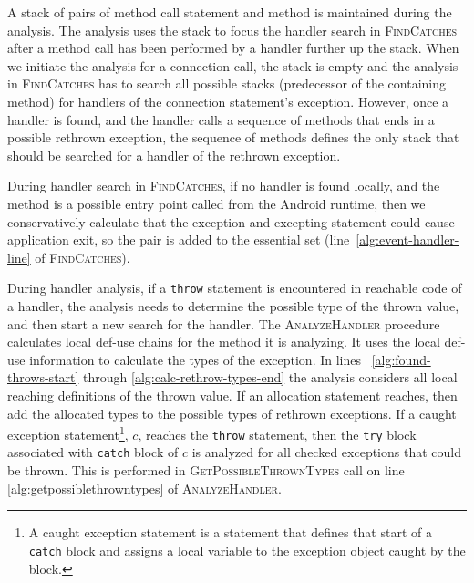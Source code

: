 A stack of pairs of method call statement and method is maintained
during the analysis.  The analysis uses the stack to focus the handler
search in \textsc{FindCatches} after a method call has been performed
by a handler further up the stack. When we initiate the analysis for
a connection call, the stack is empty and the analysis in
\textsc{FindCatches} has to search all possible stacks (predecessor of
the containing method) for handlers of the connection statement's
exception.  However, once a handler is found, and the handler calls a
sequence of methods that ends in a possible rethrown exception, the
sequence of methods defines the only stack that should be searched for
a handler of the rethrown exception.  


During handler search in \textsc{FindCatches}, if no handler is found
locally, and the method is a possible entry point called from the
Android runtime, then we conservatively calculate that the exception
and excepting statement could cause application exit, so the pair is
added to the essential set (line~\ref{alg:event-handler-line} of
\textsc{FindCatches}). 

During handler analysis, if a \lstinline!throw! statement is
encountered in reachable code of a handler, the analysis needs to
determine the possible type of the thrown value, and then start a new
search for the handler.  The \textsc{AnalyzeHandler} procedure
calculates local def-use chains for the method it is analyzing.  It
uses the local def-use information to calculate the types of the
exception.  In lines ~\ref{alg:found-throws-start} through
\ref{alg:calc-rethrow-types-end} the analysis considers all local
reaching definitions of the thrown value.  If an allocation statement
reaches, then add the allocated types to the possible types of
rethrown exceptions. If a caught exception statement\footnote{A caught
  exception statement is a statement that defines that start of a
  \lstinline!catch! block and assigns a local variable to the
  exception object caught by the block.}, $c$, reaches the
\lstinline!throw! statement, then the \lstinline!try! block associated
with \lstinline!catch! block of $c$ is analyzed for all checked
exceptions that could be thrown.  This is performed in
\textsc{GetPossibleThrownTypes} call on line
\ref{alg:getpossiblethrowntypes} of \textsc{AnalyzeHandler}.

